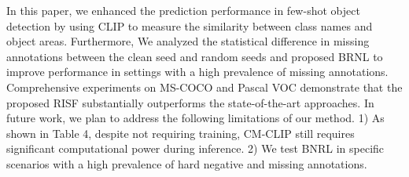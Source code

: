 \documentclass{article}
\begin{document}
In this paper, we enhanced the prediction performance in few-shot object detection by using CLIP to measure the similarity between class names and object areas.
Furthermore, We analyzed the statistical difference in missing annotations between the clean seed and random seeds and proposed BRNL to improve performance in settings with a high prevalence of missing annotations.
Comprehensive experiments on MS-COCO and Pascal VOC demonstrate that the proposed RISF substantially outperforms the state-of-the-art approaches.
In future work, we plan to address the following limitations of our method.
1) As shown in Table 4, despite not requiring training, CM-CLIP still requires significant computational power during inference.
2) We test BNRL in specific scenarios with a high prevalence of hard negative and missing annotations. 



\end{document}
